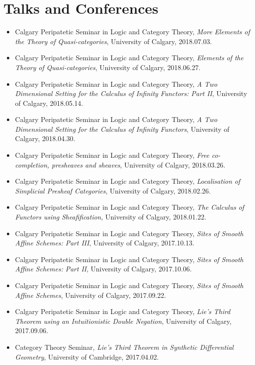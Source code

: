 \documentclass[10pt]{article}
\begin{document}
\section*{Talks and Conferences}
\begin{itemize}
    \item Calgary Peripatetic Seminar in Logic and Category Theory, \emph{More Elements of the Theory of Quasi-categories}, University of Calgary, 2018.07.03.
    \item Calgary Peripatetic Seminar in Logic and Category Theory, \emph{Elements of the Theory of Quasi-categories}, University of Calgary, 2018.06.27.
    \item Calgary Peripatetic Seminar in Logic and Category Theory, \emph{A Two Dimensional Setting for the Calculus of Infinity Functors: Part II}, University of Calgary, 2018.05.14.
    \item Calgary Peripatetic Seminar in Logic and Category Theory, \emph{A Two Dimensional Setting for the Calculus of Infinity Functors}, University of Calgary, 2018.04.30.
    \item Calgary Peripatetic Seminar in Logic and Category Theory, \emph{Free co-completion, presheaves and sheaves}, University of Calgary, 2018.03.26.
    \item Calgary Peripatetic Seminar in Logic and Category Theory, \emph{Localisation of Simplicial Presheaf Categories}, University of Calgary, 2018.02.26.
    \item Calgary Peripatetic Seminar in Logic and Category Theory, \emph{The Calculus of Functors using Sheafification}, University of Calgary, 2018.01.22.
    \item Calgary Peripatetic Seminar in Logic and Category Theory, \emph{Sites of Smooth Affine Schemes: Part III}, University of Calgary, 2017.10.13.
    \item Calgary Peripatetic Seminar in Logic and Category Theory, \emph{Sites of Smooth Affine Schemes: Part II}, University of Calgary, 2017.10.06.
    \item Calgary Peripatetic Seminar in Logic and Category Theory, \emph{Sites of Smooth Affine Schemes}, University of Calgary, 2017.09.22.
    \item  Calgary Peripatetic Seminar in Logic and Category Theory, \emph{Lie's Third Theorem using an Intuitionistic Double Negation}, University of Calgary, 2017.09.06.
    \item Category Theory Seminar, \emph{Lie's Third Theorem in Synthetic Differential Geometry},  University of Cambridge, 2017.04.02.

\end{itemize}
\end{document}
